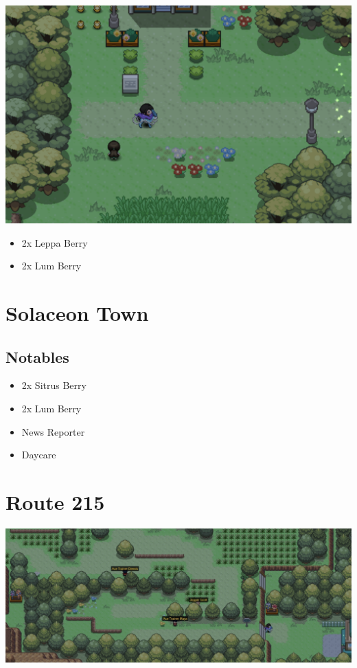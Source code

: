 \documentclass[11pt]{article}
\begin{document}
\includegraphics[width=\textwidth]{walkthrough/Sinnoh/Route_210}

\begin{itemize}
    \item 2x Leppa Berry
    \item 2x Lum Berry
\end{itemize}



\section{Solaceon Town}\label{sec:solaceon-town}

\subsection{Notables}\label{subsec:notables-solaceon-town}

\begin{itemize}
    \item 2x Sitrus Berry
    \item 2x Lum Berry
    \item News Reporter
    \item Daycare
\end{itemize}


\section{Route 215}\label{sec:Route_215}

\includegraphics[width=\textwidth]{walkthrough/Sinnoh/Route_215}
\end{document}
